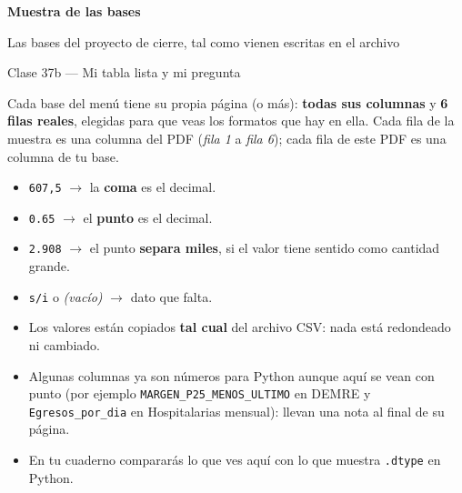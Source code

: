 \documentclass[10pt]{article}
\begin{document}
\sloppy

\begin{center}
{\Huge\bfseries\color{azuloscuro} Muestra de las bases\par}
\vspace{4pt}
{\large Las bases del proyecto de cierre, tal como vienen escritas en el archivo\par}
\vspace{2pt}
{\small Clase 37b --- Mi tabla lista y mi pregunta\par}
\end{center}

\vspace{4pt}
Cada base del menú tiene su propia página (o más): \textbf{todas sus columnas} y \textbf{6 filas reales}, elegidas para que veas los formatos que hay en ella. Cada fila de la muestra es una columna del PDF (\textit{fila 1} a \textit{fila 6}); cada fila de este PDF es una columna de tu base.

\begin{guiabox}
\begin{itemize}[leftmargin=1.4em,itemsep=2pt,topsep=2pt]
\item \texttt{607,5} $\to$ la \textbf{coma} es el decimal.
\item \texttt{0.65} $\to$ el \textbf{punto} es el decimal.
\item \texttt{2.908} $\to$ el punto \textbf{separa miles}, si el valor tiene sentido como cantidad grande.
\item \texttt{s/i} o \textit{(vacío)} $\to$ dato que falta.
\end{itemize}
\end{guiabox}

\begin{alertabox}[Ojo]
\begin{itemize}[leftmargin=1.4em,itemsep=2pt,topsep=2pt]
\item Los valores están copiados \textbf{tal cual} del archivo CSV: nada está redondeado ni cambiado.
\item Algunas columnas ya son números para Python aunque aquí se vean con punto (por ejemplo \texttt{MARGEN\_P25\_MENOS\_ULTIMO} en DEMRE y \texttt{Egresos\_por\_dia} en Hospitalarias mensual): llevan una nota al final de su página.
\item En tu cuaderno compararás lo que ves aquí con lo que muestra \texttt{.dtype} en Python.
\end{itemize}
\end{alertabox}
\end{document}
